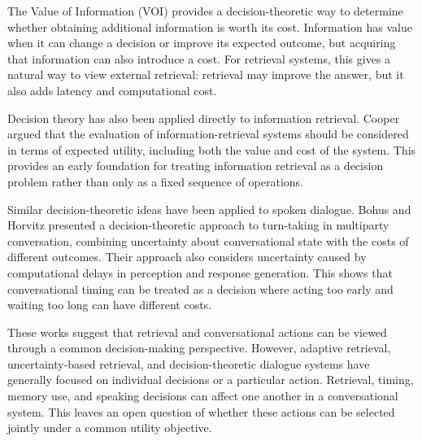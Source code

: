 The Value of Information (VOI) provides a decision-theoretic way to determine whether obtaining additional information is worth its cost. Information has value when it can change a decision or improve its expected outcome, but acquiring that information can also introduce a cost. For retrieval systems, this gives a natural way to view external retrieval: retrieval may improve the answer, but it also adds latency and computational cost.

Decision theory has also been applied directly to information retrieval. Cooper argued that the evaluation of information-retrieval systems should be considered in terms of expected utility, including both the value and cost of the system. This provides an early foundation for treating information retrieval as a decision problem rather than only as a fixed sequence of operations.

Similar decision-theoretic ideas have been applied to spoken dialogue. Bohus and Horvitz presented a decision-theoretic approach to turn-taking in multiparty conversation, combining uncertainty about conversational state with the costs of different outcomes. Their approach also considers uncertainty caused by computational delays in perception and response generation. This shows that conversational timing can be treated as a decision where acting too early and waiting too long can have different costs.

These works suggest that retrieval and conversational actions can be viewed through a common decision-making perspective. However, adaptive retrieval, uncertainty-based retrieval, and decision-theoretic dialogue systems have generally focused on individual decisions or a particular action. Retrieval, timing, memory use, and speaking decisions can affect one another in a conversational system. This leaves an open question of whether these actions can be selected jointly under a common utility objective.
